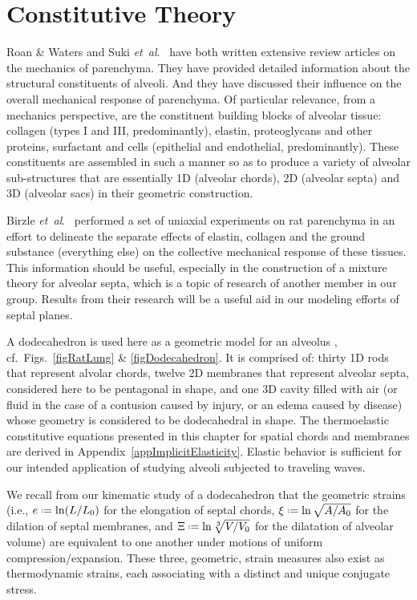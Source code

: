 \part{Constitutive Theory}
\label{partConstitutive}

Roan \& Waters \cite{RoanWaters11} and Suki \textit{et~al}.\ \cite{Sukietal05,Sukietal11} have both written extensive review articles on the mechanics of parenchyma.  They have provided detailed information about the structural constituents of alveoli.  And they have discussed their influence on the overall mechanical response of parenchyma.  Of particular relevance, from a mechanics perspective, are the constituent building blocks of alveolar tissue: collagen (types I and III, predominantly), elastin, proteoglycans and other proteins, surfactant and cells (epithelial and endothelial, predominantly).  These constituents are assembled in such a manner so as to produce a variety of alveolar sub-structures that are essentially 1D (alveolar chords), 2D (alveolar septa) and 3D (alveolar sacs) in their geometric construction.  

Birzle \textit{et~al}.\ \cite{Birzleetal19} performed a set of uniaxial experiments on rat parenchyma in an effort to delineate the separate effects of elastin, collagen and the ground substance (everything else) on the collective mechanical response of these tissues.  This information should be useful, especially in the construction of a mixture theory for alveolar septa, which is a topic of research of another member in our group.  Results from their research will be a useful aid in our modeling efforts of septal planes.

A dodecahedron is used here as a geometric model for an alveolus \cite{FrankusLee74}, cf.\ Figs.~\ref{figRatLung} \& \ref{figDodecahedron}.  It is comprised of: thirty 1D rods that represent alvolar chords, twelve 2D membranes that represent alveolar septa, considered here to be pentagonal in shape, and one 3D cavity filled with air (or fluid in the case of a contusion caused by injury, or an edema caused by disease) whose geometry is considered to be dodecahedral in shape.  The thermo\-elastic constitutive equations presented in this chapter for spatial chords and membranes are derived in Appendix~\ref{appImplicitElasticity}.  Elastic behavior is sufficient for our intended application of studying alveoli subjected to traveling waves.

We recall from our kinematic study of a dodecahedron that the geometric strains (i.e., $e \defeq \ln ( L / L_0 )$ for the elongation of septal chords, $\xi \defeq \ln \sqrt{A / A_0}$ for the dilation of septal membranes, and $\Xi \defeq \ln \sqrt[3]{V / V_0}$ for the dilatation of alveolar volume) are equivalent to one another under motions of uniform compression\slash expansion.  These three, geometric, strain measures also exist as thermo\-dynamic strains, each associating with a distinct and unique conjugate stress. \cite{Freed17,FreedZamani19}

